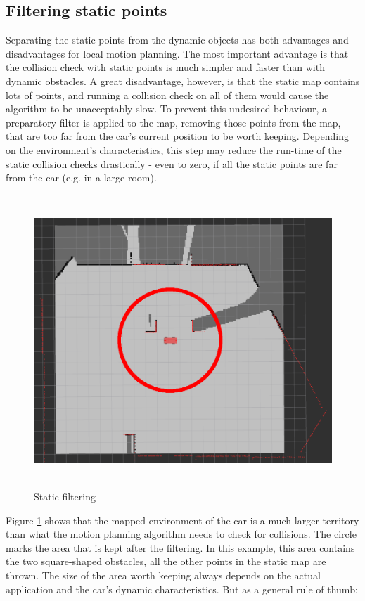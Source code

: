 \subsection{Filtering static points}
Separating the static points from the dynamic objects has both advantages and disadvantages for local motion planning. The most important advantage is that the collision check with static points is much simpler and faster than with dynamic obstacles. A great disadvantage, however, is that the static map contains lots of points, and running a collision check on all of them would cause the algorithm to be unacceptably slow. To prevent this undesired behaviour, a preparatory filter is applied to the map, removing those points from the map, that are too far from the car's current position to be worth keeping. Depending on the environment's characteristics, this step may reduce the run-time of the static collision checks drastically - even to zero, if all the static points are far from the car (e.g. in a large room).

\begin{figure}[!ht]
    \centering
    \includegraphics[height=110mm]{figures/raw/rviz_2_near_static_objects_filter.png}
    \caption{Static filtering}
    \label{rviz_2_near_static_objects_filter}
\end{figure}

Figure \ref{rviz_2_near_static_objects_filter} shows that the mapped environment of the car is a much larger territory than what the motion planning algorithm needs to check for collisions. The circle marks the area that is kept after the filtering. In this example, this area contains the two square-shaped obstacles, all the other points in the static map are thrown. The size of the area worth keeping always depends on the actual application and the car's dynamic characteristics. But as a general rule of thumb:

